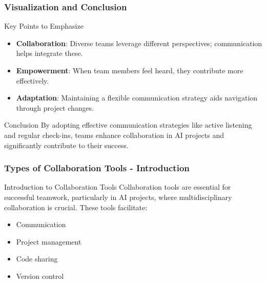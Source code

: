 \documentclass[aspectratio=169]{beamer}
\begin{document}
\begin{frame}[fragile]
    \frametitle{Visualization and Conclusion}
    \begin{block}{Key Points to Emphasize}
        \begin{itemize}
            \item \textbf{Collaboration}: Diverse teams leverage different perspectives; communication helps integrate these.
            \item \textbf{Empowerment}: When team members feel heard, they contribute more effectively.
            \item \textbf{Adaptation}: Maintaining a flexible communication strategy aids navigation through project changes.
        \end{itemize}
    \end{block}

    \begin{block}{Conclusion}
        By adopting effective communication strategies like active listening and regular check-ins, teams enhance collaboration in AI projects and significantly contribute to their success.
    \end{block}
\end{frame}

\begin{frame}[fragile]
    \frametitle{Types of Collaboration Tools - Introduction}
    \begin{block}{Introduction to Collaboration Tools}
        Collaboration tools are essential for successful teamwork, particularly in AI projects, where multidisciplinary collaboration is crucial. These tools facilitate:
        \begin{itemize}
            \item Communication
            \item Project management
            \item Code sharing
            \item Version control
        \end{itemize}
    \end{block}
\end{frame}
\end{document}
